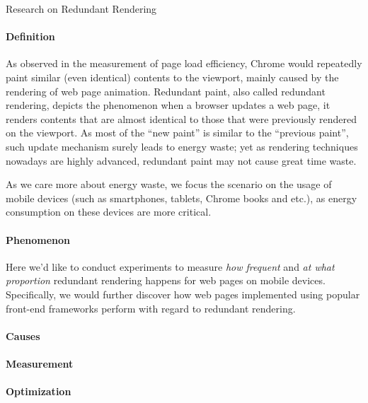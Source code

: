 \documentclass[12pt]{article}
\begin{document}
\centerline{\large{Research on Redundant Rendering}}

\paragraph{Definition} As observed in the measurement of page load efficiency, Chrome would repeatedly paint similar (even identical) contents to the viewport, mainly caused by the rendering of web page animation. Redundant paint, also called redundant rendering, depicts the phenomenon when a browser updates a web page, it renders contents that are almost identical to those that were previously rendered on the viewport. As most of the ``new paint'' is similar to the ``previous paint'', such update mechanism surely leads to energy waste; yet as rendering techniques nowadays are highly advanced, redundant paint may not cause great time waste. 

As we care more about energy waste, we focus the scenario on the usage of mobile devices (such as smartphones, tablets, Chrome books and etc.), as energy consumption on these devices are more critical.

\paragraph{Phenomenon} Here we'd like to conduct experiments to measure \emph{how frequent} and \emph{at what proportion} redundant rendering happens for web pages on mobile devices. Specifically, we would further discover how web pages implemented using popular front-end frameworks perform with regard to redundant rendering.

\paragraph{Causes}

\paragraph{Measurement}

\paragraph{Optimization}
\end{document}
